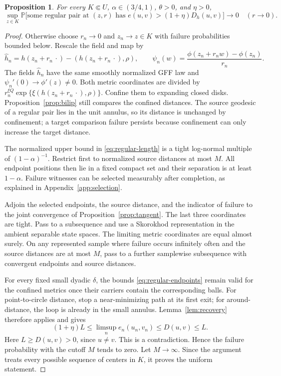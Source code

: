 \documentclass[11pt]{article}
\newtheorem{proposition}[theorem]{Proposition}
\theoremstyle{definition}
\theoremstyle{remark}
\newcommand{\Pp}{\mathbb P}
\begin{document}
\begin{proposition}\label{prop:regular}
For every $K\Subset U$, $\alpha\in(3/4,1)$, $\theta>0$, and
$\eta>0$,
\begin{equation}\label{eq:regular-prob}
 \sup_{z\in K}\Pp\big[\text{some regular pair at }(z,r)
          \text{ has }e(u,v)>(1+\eta)D_h(u,v)\big]
                       \longrightarrow0\quad(r\to0).
\end{equation}
\end{proposition}
\begin{proof}
Otherwise choose $r_n\to0$ and $z_n\to z\in K$ with failure
probabilities bounded below. Rescale the field and map by
\[
 \widehat h_n=h(z_n+r_n\,\cdot)
              -(h(z_n+r_n\,\cdot),\rho),\qquad
 \psi_n(w)=\frac{\phi(z_n+r_nw)-\phi(z_n)}{r_n}.
\]
The fields $\widehat h_n$ have the same smoothly normalized GFF
law and $\psi_n'(0)\to\phi'(z)\ne0$. Both metric coordinates
are divided by
$r_n^{\xi Q}\exp\{\xi(h(z_n+r_n\,\cdot),\rho)\}$.
Confine them to expanding closed disks. Proposition~\ref{prop:bilip}
still compares the confined distances. The source geodesic of a
regular pair lies in the unit annulus, so its distance is unchanged
by confinement; a target comparison failure persists because
confinement can only increase the target distance.

The normalized upper bound in \eqref{eq:regular-length} is a
tight log-normal multiple of $(1-\alpha)^{-1}$. Restrict first
to normalized source distances at most $M$. All endpoint positions
then lie in a fixed compact set and their separation is at least
$1-\alpha$. Failure witnesses can be selected measurably after
completion, as explained in Appendix~\ref{app:selection}.

Adjoin the selected endpoints, the source distance, and the
indicator of failure to the joint convergence of
Proposition~\ref{prop:tangent}. The last three coordinates are
tight. Pass to a subsequence and use a Skorokhod representation
in the ambient separable state spaces. The limiting metric
coordinates are equal almost surely. On any represented sample
where failure occurs infinitely often and the source distances
are at most $M$, pass to a further samplewise subsequence with
convergent endpoints and source distances.

For every fixed small dyadic $\delta$, the bounds
\eqref{eq:regular-endpoints} remain valid for the confined
metrics once their carriers contain the corresponding balls.
For point-to-circle distance, stop a near-minimizing path at its
first exit; for around-distance, the loop is already in the small
annulus. Lemma~\ref{lem:recovery} therefore applies and gives
\[
 (1+\eta)L\le\limsup_n e_n(u_n,v_n)
                  \le D(u,v)\le L.
\]
Here $L\ge D(u,v)>0$, since $u\ne v$. This is a contradiction.
Hence the failure probability with the cutoff $M$ tends to zero.
Let $M\to\infty$. Since the argument treats every possible
sequence of centers in $K$, it proves the uniform statement.
\end{proof}
\end{document}
